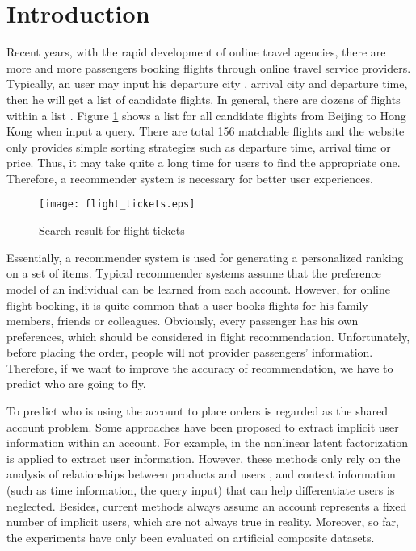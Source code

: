 \documentclass{llncs}
\begin{document}
\section{Introduction}
\label{sec:intro}
Recent years, with the rapid development of online travel agencies, there are more and more passengers booking flights through online travel service providers. Typically, an user may input his departure city , arrival city  and departure time, then he will get a list of candidate flights. In general, there are dozens of flights within a list .  Figure \ref{fig:res} shows a list for all candidate flights  from Beijing to Hong Kong when input a query. There are total 156 matchable flights and the website only provides simple sorting strategies such as departure time, arrival time or price. Thus, it may take quite a long time for users to find the appropriate one. Therefore, a recommender system is  necessary for better user experiences.
\begin{figure}[!hbt]
\centering
\texttt{[image: flight\_tickets.eps]}
\caption{Search result for flight tickets}
\label{fig:res}
\end{figure}\par
Essentially, a recommender system is used for generating a personalized ranking on a set of items\cite{lv:rec}. Typical recommender systems assume that the preference model of an individual can be learned from each account. However, for online flight booking, it is quite common that a user books flights for his family members, friends or colleagues.  Obviously, every passenger has his own preferences, which should be considered in flight recommendation. Unfortunately, before placing the order, people will not provider passengers' information.  Therefore, if we want to improve the accuracy of recommendation, we have to predict who are going to fly.  \par
 To predict who is using the account to place orders is regarded as the shared account problem. Some approaches have been proposed to extract implicit user information within an account. For example,  in \cite{kabbur:nlmf}\cite{jason:embedding} the nonlinear latent factorization is applied to  extract user information. However, these methods only rely on the analysis of relationships between products and users \cite{koen:top-n}\cite{yutaka:modeling}, and context information (such as time information, the query input) that can help differentiate users is neglected. Besides, current methods always assume an account represents a fixed number of implicit users, which are not always true in reality. Moreover, so far, the experiments have only been evaluated on artificial composite datasets. 
\end{document}
